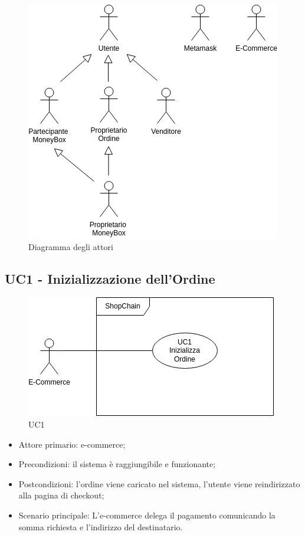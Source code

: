 \begin{figure}[H]
    \centering
    \includegraphics[scale=0.7]{immagini/Attori.png}
    \caption{Diagramma degli attori}
\end{figure}

\subsection{UC1 - Inizializzazione dell'Ordine}\label{subsection: UC1}

\begin{figure}[H]
    \centering
    \includegraphics[scale=0.9]{immagini/UC1.png}
    \caption{UC1}
\end{figure}

\begin{itemize}
    \item Attore primario: e-commerce\glo{};
    \item Precondizioni: il sistema è raggiungibile e funzionante;
    \item Postcondizioni: l'ordine viene caricato nel sistema, l'utente viene reindirizzato alla pagina di checkout;
    \item Scenario principale: L'e-commerce\glo{} delega il pagamento comunicando la somma richiesta e l'indirizzo del destinatario.
\end{itemize}

